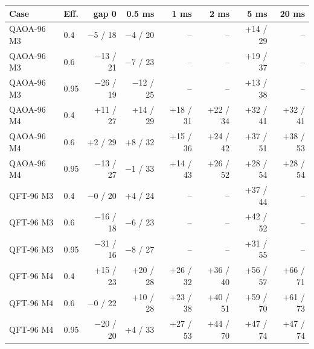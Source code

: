 \begin{tabular}{llrrrrrr}
\toprule
Case & Eff. & gap 0 & 0.5 ms & 1 ms & 2 ms & 5 ms & 20 ms \\
\midrule
QAOA-96 M3 & 0.4 & $-$5 / 18 & $-$4 / 20 & -- & -- & +14 / 29 & -- \\
QAOA-96 M3 & 0.6 & $-$13 / 21 & $-$7 / 23 & -- & -- & +19 / 37 & -- \\
QAOA-96 M3 & 0.95 & $-$26 / 19 & $-$12 / 25 & -- & -- & +13 / 38 & -- \\
QAOA-96 M4 & 0.4 & +11 / 27 & +14 / 29 & +18 / 31 & +22 / 34 & +32 / 41 & +32 / 41 \\
QAOA-96 M4 & 0.6 & +2 / 29 & +8 / 32 & +15 / 36 & +24 / 42 & +37 / 51 & +38 / 53 \\
QAOA-96 M4 & 0.95 & $-$13 / 27 & $-$1 / 33 & +14 / 43 & +26 / 52 & +28 / 54 & +28 / 54 \\
QFT-96 M3 & 0.4 & $-$0 / 20 & +4 / 24 & -- & -- & +37 / 44 & -- \\
QFT-96 M3 & 0.6 & $-$16 / 18 & $-$6 / 23 & -- & -- & +42 / 52 & -- \\
QFT-96 M3 & 0.95 & $-$31 / 16 & $-$8 / 27 & -- & -- & +31 / 55 & -- \\
QFT-96 M4 & 0.4 & +15 / 23 & +20 / 28 & +26 / 32 & +36 / 40 & +56 / 57 & +66 / 71 \\
QFT-96 M4 & 0.6 & $-$0 / 22 & +10 / 28 & +23 / 38 & +40 / 51 & +59 / 70 & +61 / 73 \\
QFT-96 M4 & 0.95 & $-$20 / 20 & +4 / 33 & +27 / 53 & +44 / 70 & +47 / 74 & +47 / 74 \\
\bottomrule
\end{tabular}
